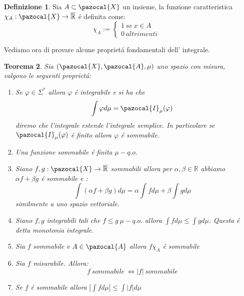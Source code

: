 \documentclass[11pt,a4paper]{report}
\theoremstyle{plain}
\newtheorem{thm}{Teorema}[chapter] %
\theoremstyle{definition}
\newtheorem{defn}[thm]{Definizione} %
\newcommand{\X}{\pazocal{X}}
\newcommand{\I}{\pazocal{I}}
\newcommand{\A}{\pazocal{A}}
\begin{document}
\begin{defn}
	Sia $A \subset \X$ un insieme, la funzione caratteristica $\chi_A : \X \rightarrow \overline{\mathbb{R}}$ \'e definita come:
	\[
		\chi_A := \begin{cases}
			1\ se\ x \in A\\
			0\ altrimenti 
		\end{cases}
	\]
\end{defn}
Vediamo ora di provare alcune propriet\'a fondamentali dell' integrale.
\begin{thm}
	Sia $(\X,\A,\mu)$ uno spazio con misura, valgono le seguenti propriet\'a:
	\begin{enumerate}
		\item Se $\varphi \in \Sigma^*$ allora $\varphi$ \'e integrabile e si ha che
		\[
			\int \varphi d\mu = \I_\mu(\varphi)
		\]
		diremo che l'integrale estende l'integrale semplice. In particolare se $\I_\mu(\varphi)$ \'e finito allora $\varphi$ \'e sommabile.
		\item Una funzione sommabile \'e finita $\mu-q.o.$
		\item Siano $f,g : \X \rightarrow \overline{\mathbb{R}}$ sommabili allora per $\alpha,\beta \in \mathbb{R}$ abbiamo $\alpha f + \beta g$ \'e sommabile e :
		\[
			\int (\alpha f + \beta g) d\mu = \alpha\int f d\mu + \beta\int g d\mu		
		\]
		similmente a uno spazio vettoriale.
		\item Siano $f,g$ integrabili tali che $f \le g\ \mu-q.o.$ allora $\int fd\mu	 \le \int gd\mu$. Questa \'e detta monotonia integrale.
		\item Sia $f$ sommabile e $A \in \A$ allora $f\chi_A$ \'e sommabile
		\item Sia $f$ misurabile. Allora:
		\[
			f\ sommabile\ \iff |f|\ sommabile		
		\]
		\item Se $f$ \'e  sommabile allora $|\int f d\mu| \le \int |f| d \mu$
	\end{enumerate}
\end{thm}
\end{document}
